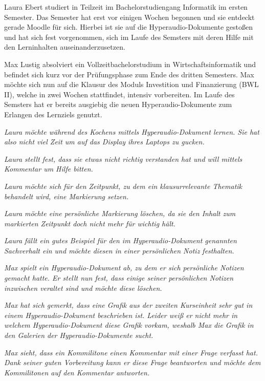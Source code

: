 Laura Ebert studiert in Teilzeit im Bachelorstudiengang Informatik im ersten Semester. Das Semester hat erst vor einigen Wochen begonnen und sie entdeckt gerade Moodle für sich. Hierbei ist sie auf die Hyperaudio-Dokumente gestoßen und hat sich fest vorgenommen, sich im Laufe des Semsters mit deren Hilfe mit den Lerninhalten auseinanderzusetzen.
 
Max Lustig absolviert ein Vollzeitbachelorstudium in Wirtschaftsinformatik und befindet sich kurz vor der Prüfungsphase zum Ende des dritten Semesters. Max möchte sich nun auf die Klausur des Moduls \glqq Investition und Finanzierung (BWL II)\grqq{}, welche in zwei Wochen stattfindet, intensiv vorbereiten. Im Laufe des Semsters hat er bereits ausgiebig die neuen Hyperaudio-Dokumente zum Erlangen des Lernziels genutzt.

\textit{Laura möchte während des Kochens mittels Hyperaudio-Dokument lernen. Sie hat also nicht viel Zeit um auf das Display ihres Laptops zu gucken.}

\textit{Laura stellt fest, dass sie etwas nicht richtig verstanden hat und will mittels Kommentar um Hilfe bitten.}

\textit{Laura möchte sich für den Zeitpunkt, zu dem ein klausurrelevante Thematik behandelt wird, eine Markierung setzen.}

\textit{Laura möchte eine persönliche Markierung löschen, da sie den Inhalt zum markierten Zeitpunkt doch nicht mehr für wichtig hält.}

\textit{Laura fällt ein gutes Beispiel für den im Hyperaudio-Dokument genannten Sachverhalt ein und möchte diesen in einer persönlichen Notiz festhalten.}

\textit{Max spielt ein Hyperaudio-Dokument ab, zu dem er sich persönliche Notizen gemacht hatte. Er stellt nun fest, dass einige seiner persönlichen Notizen inzwischen veraltet sind und möchte diese löschen.}

\textit{Max hat sich gemerkt, dass eine Grafik aus der zweiten Kurseinheit sehr gut in einem Hyperaudio-Dokument beschrieben ist. Leider weiß er nicht mehr in welchem Hyperaudio-Dokument diese Grafik vorkam, weshalb Max die Grafik in den Galerien der Hyperaudio-Dokumente sucht.}

\textit{Max sieht, dass ein Kommilitone einen Kommentar mit einer Frage verfasst hat. Dank seiner guten Vorbereitung kann er diese Frage beantworten und möchte dem Kommilitonen auf den Kommentar antworten.}


